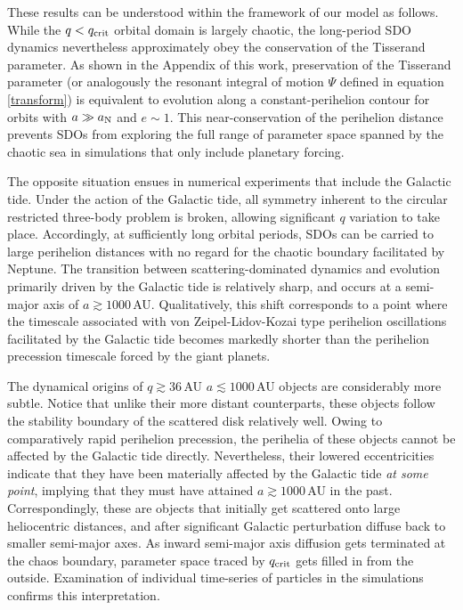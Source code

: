 \documentclass[twocolumn]{aastex62}
\newcommand{\an}{a_{\rm{N}}}
\begin{document}
These results can be understood within the framework of our model as follows. While the $q<q_{\rm{crit}}$ orbital domain is largely chaotic, the long-period SDO dynamics nevertheless approximately obey the conservation of the Tisserand parameter. As shown in the Appendix of this work, preservation of the Tisserand parameter (or analogously the resonant integral of motion $\Psi$ defined in equation \ref{transform}) is equivalent to evolution along a constant-perihelion contour for orbits with $a\gg\an$ and $e\sim1$. This near-conservation of the perihelion distance prevents SDOs from exploring the full range of parameter space spanned by the chaotic sea in simulations that only include planetary forcing. 

The opposite situation ensues in numerical experiments that include the Galactic tide. Under the action of the Galactic tide, all symmetry inherent to the circular restricted three-body problem is broken, allowing significant $q$ variation to take place. Accordingly, at sufficiently long orbital periods, SDOs can be carried to large perihelion distances with no regard for the chaotic boundary facilitated by Neptune. The transition between scattering-dominated dynamics and evolution primarily driven by the Galactic tide is relatively sharp, and occurs at a semi-major axis of $a\gtrsim1000\,$AU. Qualitatively, this shift corresponds to a point where the timescale associated with von Zeipel-Lidov-Kozai type perihelion oscillations facilitated by the Galactic tide becomes markedly shorter than the perihelion precession timescale forced by the giant planets.

The dynamical origins of $q\gtrsim36\,$AU $a\lesssim1000\,$AU objects are considerably more subtle. Notice that unlike their more distant counterparts, these objects follow the stability boundary of the scattered disk relatively well. Owing to comparatively rapid perihelion precession, the perihelia of these objects cannot be affected by the Galactic tide directly. Nevertheless, their lowered eccentricities indicate that they have been materially affected by the Galactic tide \textit{at some point}, implying that they must have attained $a\gtrsim1000\,$AU in the past. Correspondingly, these are objects that initially get scattered onto large heliocentric distances, and after significant Galactic perturbation diffuse back to smaller semi-major axes. As inward semi-major axis diffusion gets terminated at the chaos boundary, parameter space traced by $q_{\rm{crit}}$ gets filled in from the outside. Examination of individual time-series of particles in the simulations confirms this interpretation.
\end{document}
